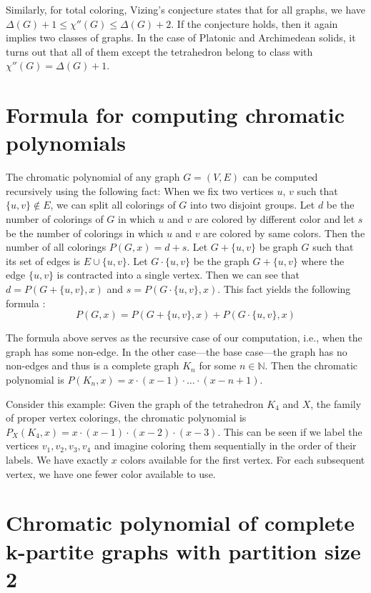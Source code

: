 Similarly, for total coloring, Vizing's conjecture \cite{vizing68} states that for all graphs, we have $\Delta(G) + 1 \leq \chi''(G) \leq \Delta(G) + 2$. If the conjecture holds, then it again implies two classes of graphs. In the case of Platonic and Archimedean solids, it turns out that all of them except the tetrahedron belong to class with $\chi''(G) = \Delta(G) + 1$.

\section{Formula for computing chromatic polynomials}

The chromatic polynomial of any graph $G = (V, E)$ can be computed recursively using the following fact: When we fix two vertices $u$, $v$ such that $\{u,v\} \notin E$, we can split all colorings of $G$ into two disjoint groups. Let $d$ be the number of colorings of $G$ in which $u$ and $v$ are colored by different color and let $s$ be the number of colorings in which $u$ and $v$ are colored by same colors. Then the number of all colorings $P(G,x) = d + s$. Let $G+\{u,v\}$ be graph $G$ such that its set of edges is $E \cup \{u,v\}$. Let $G \cdot \{u,v\}$ be the graph $G + \{u,v\}$ where the edge $\{u,v\}$ is contracted into a single vertex. Then we can see that $d = P(G + \{u,v\},x)$ and $s = P(G \cdot \{u,v\},x)$. This fact yields the following formula \cite{chartrand2019}:
\begin{equation}\label{eqn:chrom_poly_nonedge}
 P(G,x) = P(G + \{u,v\},x) + P(G \cdot \{u,v\},x)
\end{equation}

The formula above serves as the recursive case of our computation, i.e., when the graph has some non-edge. In the other case—the base case—the graph has no non-edges and thus is a complete graph $K_n$ for some $n \in \mathbb{N}$. Then the chromatic polynomial is $P(K_n,x) = x \cdot (x-1) \cdot \ldots \cdot (x-n+1)$.

Consider this example: Given the graph of the tetrahedron $K_4$ and $X$, the family of proper vertex colorings, the chromatic polynomial is $P_{X}(K_4,x) = x \cdot (x-1) \cdot (x-2) \cdot (x-3)$. This can be seen if we label the vertices $v_1, v_2, v_3, v_4$ and imagine coloring them sequentially in the order of their labels. We have exactly $x$ colors available for the first vertex. For each subsequent vertex, we have one fewer color available to use.

\section{Chromatic polynomial of complete k-partite graphs with partition size 2}

